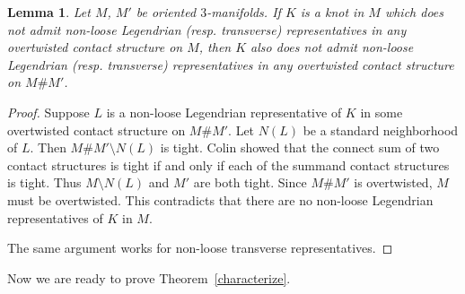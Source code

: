 \documentclass[11pt]{amsart}
\theoremstyle{plain}
\newtheorem{lemma}[theorem]{Lemma}
\theoremstyle{definition}
\theoremstyle{remark}
\numberwithin{theorem}{section}
\begin{document}
\begin{lemma}\label{lem:connectsum}
  Let $M$, $M'$ be oriented $3$-manifolds. If $K$ is a knot in $M$ which does not admit non-loose Legendrian ({\it resp.} transverse) representatives in any overtwisted contact structure on $M$, then $K$ also does not admit non-loose Legendrian ({\it resp.} transverse) representatives in any overtwisted contact structure on $M \# M'$. 
\end{lemma}

\begin{proof}
  Suppose $L$ is a non-loose Legendrian representative of $K$ in some overtwisted contact structure on $M \# M'$. Let $N(L)$ be a standard neighborhood of $L$. Then $M \# M' \setminus N(L)$ is tight. Colin \cite{Colin97} showed that the connect sum of two contact structures is tight if and only if each of the summand contact structures is tight. Thus $M \setminus N(L)$ and $M'$ are both tight. Since $M \# M'$ is overtwisted, $M$ must be overtwisted. This contradicts that there are no non-loose Legendrian representatives of $K$ in $M$. 

  The same argument works for non-loose transverse representatives. 
\end{proof}

Now we are ready to prove Theorem~\ref{characterize}.
\end{document}
